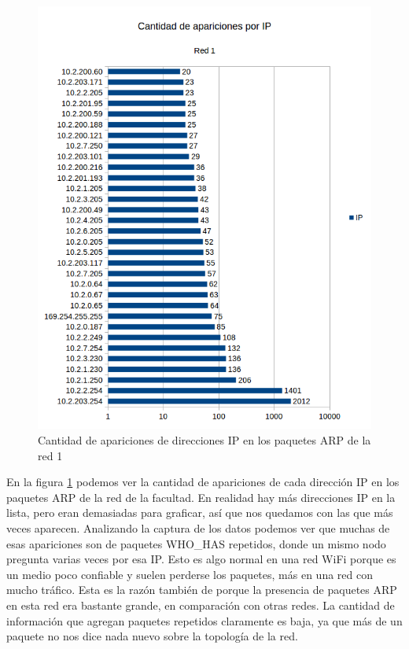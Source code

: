 \begin{figure}[H]
	\centering
	\includegraphics[scale=0.65]{imgs/red1_identificar.png}
	\caption{Cantidad de apariciones de direcciones IP en los paquetes ARP de la red 1}
      \label{red1_identificar}
\end{figure}

En la figura \ref{red1_identificar} podemos ver la cantidad de apariciones de cada dirección IP en los paquetes ARP de la red de la facultad. En realidad hay más direcciones IP en la lista, pero eran demasiadas para graficar, así que nos quedamos con las que más veces aparecen. Analizando la captura de los datos podemos ver que muchas de esas apariciones son de paquetes WHO\_HAS repetidos, donde un mismo nodo pregunta varias veces por esa IP. Esto es algo normal en una red WiFi porque es un medio poco confiable y suelen perderse los paquetes, más en una red con mucho tráfico. Esta es la razón también de porque la presencia de paquetes ARP en esta red era bastante grande, en comparación con otras redes. La cantidad de información que agregan paquetes repetidos claramente es baja, ya que más de un paquete no nos dice nada nuevo sobre la topología de la red.

